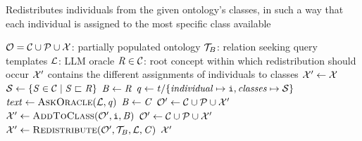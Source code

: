 \begin{algorithm}
    \captionsetup{font=\algCaptionSize}
    \caption{Redistributes individuals from the given ontology's classes, in such a way that each individual is assigned to the most specific class available}
    \label{alg:redistribute}
    \begin{algorithmic}[1]\algCodeSize
        \Require $\relset{O} = \relset{C} \cup \relset{P} \cup \relset{X}$: partially populated ontology
        \Require $\relset{T}_{B}$: relation seeking query templates
        \Require $\relset{L}$: LLM oracle
        \Require $\concept{R} \in \relset{C}$: root concept within which redistribution should occur
        \Ensure $\relset{X}'$ contains the different assignments of individuals to classes
        \medskip
            \State $\relset{X}' \gets \relset{X}$
            \State $\relset{S} \gets \{ \concept{S} \in \relset{C} \mid \concept{S} \sqsubset \concept{R} \}$
                \State $\concept{B} \gets \concept{R}$
                    \State $\mathit{q} \gets \mathit{t}/\{ \var{individual} \mapsto \instance{i}, \var{classes} \mapsto \relset{S} \}$
                    \State $\mathit{text} \gets \Call{\askOracle}{\relset{L}, \mathit{q}}$
                        \State $\concept{B} \gets \concept{C}$
                        \State {}
                    \EndFor
                \EndFor
                \State $\relset{O}' \gets \relset{C} \cup \relset{P} \cup \relset{X}'$ \label{line:first-result}
                \State $\relset{X}' \gets \Call{\addToClass}{\relset{O}', \instance{i}, \concept{B}}$
            \EndFor
                \State $\relset{O}' \gets \relset{C} \cup \relset{P} \cup \relset{X}'$
                \State $\relset{X}' \gets \Call{\redistribute}{\relset{O}', \relset{T}_{B}, \relset{L}, \concept{C}}$
            \EndFor
            \State \Return $\relset{X}'$
        \EndFunction
    \end{algorithmic}
\end{algorithm}